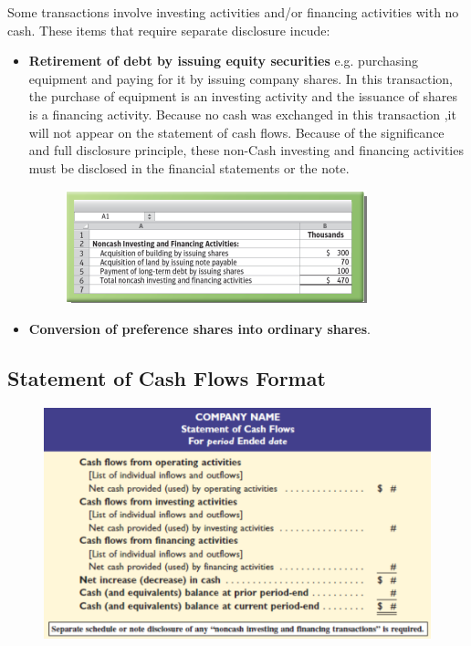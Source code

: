 \documentclass[../main.tex]{subfiles}
\begin{document}
	Some transactions involve investing activities and/or financing activities 
	with no cash. These items that require separate disclosure incude:
	\begin{itemize}[noitemsep]
		\item \textbf{Retirement of debt by issuing equity securities} e.g. 
		purchasing equipment and paying for it by issuing company shares. In 
		this transaction, the purchase of equipment is an investing activity 
		and the issuance of shares is a financing activity. Because no cash was 
		exchanged in this transaction ,it will not appear on the 
		statement of cash flows. Because of the significance and full 
		disclosure principle, these non-Cash investing and financing activities 
		must be disclosed in the financial statements or the note. 
		\begin{figure}[ht]
			\centering
			\includegraphics[width=0.9\columnwidth]{images/c10_noncash_investing_financing.png}
		\end{figure}
		\item \textbf{Conversion of preference shares into ordinary shares}. 
	\end{itemize}

	\subsection{Statement of Cash Flows Format}
	
	\begin{figure}[ht]
		\centering
		\includegraphics[width=\columnwidth]{images/c9/statement_of_cash_flows.png}
	\end{figure}
\end{document}

